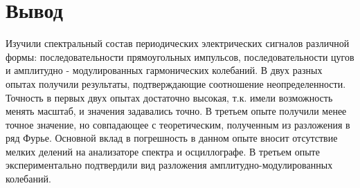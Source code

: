 \documentclass[a4paper, 12pt]{article}
\begin{document}
\section{Вывод}

Изучили спектральный состав периодических электрических сигналов различной формы: последовательности прямоугольных импульсов, последовательности цугов и амплитудно - модулированных гармонических колебаний. В двух разных опытах получили результаты, подтверждающие соотношение неопределенности. Точность в первых двух опытах достаточно высокая, т.к. имели возможность менять масштаб, и значения задавались точно. В третьем опыте получили менее точное значение, но совпадающее с теоретическим, полученным из разложения в ряд Фурье. Основной вклад в погрешность в данном опыте вносит отсутствие мелких делений на анализаторе спектра и осциллографе. В третьем опыте экспериментально подтвердили вид разложения амплитудно-модулированных колебаний.
\end{document}
